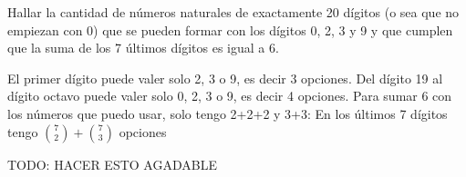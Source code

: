 \begin{enunciado}{\ejercicio}
        Hallar la cantidad de números naturales de exactamente 20 dígitos (o sea que no empiezan con 0) que se pueden
        formar con los dígitos 0, 2, 3 y 9 y que cumplen que la suma de los 7 últimos dígitos es igual a 6.
\end{enunciado}

El primer dígito puede valer solo 2, 3 o 9, es decir 3 opciones.
Del dígito 19 al dígito octavo puede valer solo 0, 2, 3 o 9, es decir 4 opciones. 
Para sumar 6 con los números que puedo usar, solo tengo 2+2+2 y 3+3:
En los últimos 7 dígitos tengo $\binom{7}{2} + \binom{7}{3}$ opciones

TODO:
HACER ESTO AGADABLE
